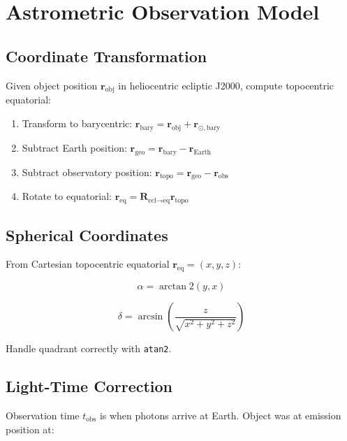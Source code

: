 \section{Astrometric Observation Model}

\subsection{Coordinate Transformation}

Given object position $\mathbf{r}_{\text{obj}}$ in heliocentric ecliptic J2000, compute topocentric equatorial:

\begin{enumerate}
    \item Transform to barycentric: $\mathbf{r}_{\text{bary}} = \mathbf{r}_{\text{obj}} + \mathbf{r}_{\odot,\text{bary}}$
    \item Subtract Earth position: $\mathbf{r}_{\text{geo}} = \mathbf{r}_{\text{bary}} - \mathbf{r}_{\text{Earth}}$
    \item Subtract observatory position: $\mathbf{r}_{\text{topo}} = \mathbf{r}_{\text{geo}} - \mathbf{r}_{\text{obs}}$
    \item Rotate to equatorial: $\mathbf{r}_{\text{eq}} = \mathbf{R}_{\text{ecl}\to\text{eq}} \mathbf{r}_{\text{topo}}$
\end{enumerate}

\subsection{Spherical Coordinates}

From Cartesian topocentric equatorial $\mathbf{r}_{\text{eq}} = (x, y, z)$:

\begin{equation}
    \alpha = \arctan2(y, x)
\end{equation}

\begin{equation}
    \delta = \arcsin\left(\frac{z}{\sqrt{x^2 + y^2 + z^2}}\right)
\end{equation}

Handle quadrant correctly with \texttt{atan2}.

\subsection{Light-Time Correction}

Observation time $t_{\text{obs}}$ is when photons arrive at Earth. Object was at emission position at:

